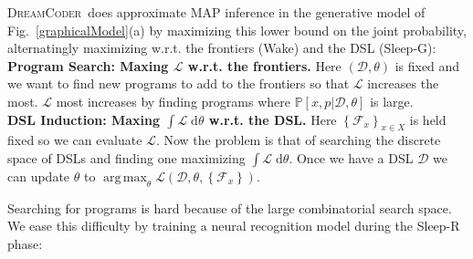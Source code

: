 \documentclass{article}
\newcommand{\system}{\textsc{DreamCoder}~}
\newcommand{\lowerBound}{\mathscr{L}}
\DeclareMathOperator*{\argmax}{arg\,max} %
\newcommand{\probability}{\mathds{P}} %
\begin{document}

\system does approximate MAP inference in the generative model of Fig.~\ref{graphicalModel}(a) by maximizing this lower bound on the joint probability,
alternatingly maximizing w.r.t. the frontiers (Wake) and the DSL (Sleep-G):
\\\noindent \textbf{Program Search: Maxing $\lowerBound$ w.r.t. the frontiers.} Here $(\mathcal{D},\theta)$ is fixed and we
want to find new programs to add to  the frontiers so that $\lowerBound$ increases the most.
$\lowerBound$ most increases by finding programs where $\probability[x,p|\mathcal{D},\theta]$
is large.
\\\noindent \textbf{DSL Induction: Maxing $\int \lowerBound\;\mathrm{d}\theta$ w.r.t. the DSL.} Here $\left\{\mathcal{F}_x \right\}_{x\in X}$ is held fixed so we can evaluate $\lowerBound$. Now the problem is that of searching the discrete space of DSLs and finding one maximizing $\int \lowerBound\;\mathrm{d}\theta$.
Once we have a DSL $\mathcal{D}$ we can update $\theta$ to $\argmax_\theta \lowerBound(\mathcal{D},\theta,\left\{\mathcal{F}_x \right\})$. 


Searching for programs is hard because
of the large combinatorial search space. We ease this difficulty by training a neural recognition model
during the Sleep-R phase:
\end{document}

